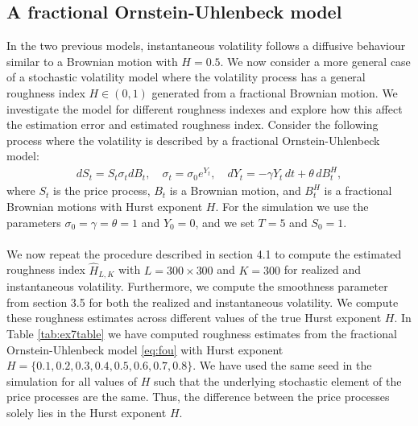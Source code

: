 \documentclass{article}
\begin{document}
\subsection{A fractional Ornstein-Uhlenbeck model}
In the two previous models, instantaneous volatility follows a diffusive behaviour similar to a Brownian motion with $H=0.5$. We now consider a more general case of a stochastic volatility model where the volatility process has a general roughness index $H\in(0,1)$ generated from a fractional Brownian motion. We investigate the model for different roughness indexes and explore how this affect the estimation error and estimated roughness index. Consider the following process where the volatility is described by a fractional Ornstein-Uhlenbeck model:
\begin{align}
dS_t = S_t \sigma_t dB_t, \quad \sigma_t = \sigma_0 e^{Y_t}, \quad dY_t = -\gamma Y_t \, dt + \theta \, dB^H_t, \label{eq:fou}
\end{align}
where $S_t$ is the price process, $B_t$ is a Brownian motion, and $B_t^H$ is a fractional Brownian motions with Hurst exponent $H$. For the simulation we use the parameters $\sigma_0 =\gamma=\theta=1$ and $Y_0=0$, and we set $T=5$ and $S_0=1$.\\\\
We now repeat the procedure described in section 4.1 to compute the estimated roughness index $\hat{H}_{L,K}$ with $L=300\times 300$ and $K=300$ for realized and instantaneous volatility. Furthermore, we compute the smoothness parameter from section 3.5 for both the realized and instantaneous volatility. We compute these roughness estimates across different values of the true Hurst exponent $H$. In Table \ref{tab:ex7table} we have computed roughness estimates from the fractional Ornstein-Uhlenbeck model \eqref{eq:fou} with Hurst exponent $H=\{0.1,0.2,0.3,0.4,0.5,0.6,0.7,0.8\}$. We have used the same seed in the simulation for all values of $H$ such that the underlying stochastic element of the price processes are the same. Thus, the difference between the price processes solely lies in the Hurst exponent $H$.
\end{document}

